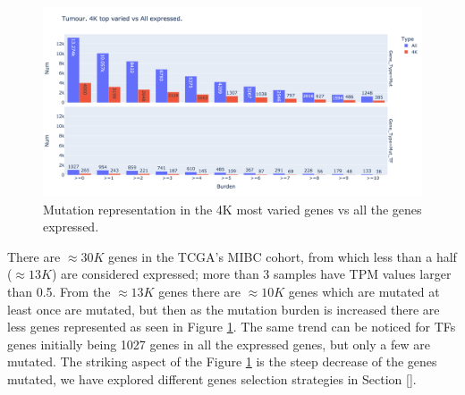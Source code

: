 \begin{figure}[!htb]    \centering\includegraphics[width=1.0\textwidth,height=0.6\textheight,keepaspectratio]{Sections/Network_I/Resources/Tum_network/MutTF_representation_4K-all.png}
    \caption{Mutation representation in the 4K most varied genes vs all the genes expressed.}
    \label{fig:N_I:mut_rep_tum}
\end{figure}


There are $\approx30K$ genes in the TCGA's MIBC cohort, from which less than a half ($\approx13K$) are considered expressed; more than 3 samples have TPM values larger than 0.5. From the $\approx13K$ genes there are $\approx10K$ genes which are mutated at least once are mutated, but then as the mutation burden is increased there are less genes represented as seen in Figure \ref{fig:N_I:mut_rep_tum}. The same trend can be noticed for TFs genes initially being 1027 genes in all the expressed genes, but only a few are mutated. The striking aspect of the Figure \ref{fig:N_I:mut_rep_tum} is the steep decrease of the genes mutated, we have explored different genes selection strategies in Section \ref{}.


